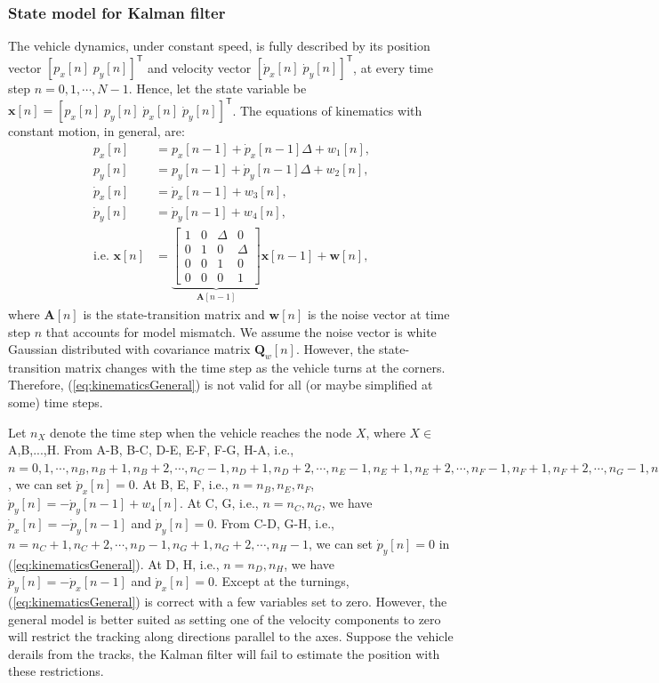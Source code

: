 \documentclass[11pt]{article}
\newcommand{\bx}{\mathbf{x}}
\newcommand{\bw}{\mathbf{w}}
\newcommand{\bA}{\mathbf{A}}
\newcommand{\bQ}{\mathbf{Q}}
\newcommand{\TT}{\mathsf{T}}
\begin{document}
\subsubsection{State model for Kalman filter}
\label{subsubsec:stateModel}

The vehicle dynamics, under constant speed, is fully described by its position vector $[p_{x}[n] \; p_{y}[n]]^{\TT}$ and velocity vector $[\dot{p}_{x}[n] \; \dot{p}_{y}[n]]^{\TT}$, at every time step $n=0,1,\cdots,N-1$. Hence, let the state variable be $\bx[n] = [p_{x}[n] \; p_{y}[n] \; \dot{p}_{x}[n] \; \dot{p}_{y}[n]]^{\TT}$. The equations of kinematics with constant motion, in general, are:
\begin{equation}
\begin{split}
	p_{x}[n] &= p_{x}[n-1] + \dot{p}_{x}[n-1] \Delta + w_{1}[n], \\
	p_{y}[n] &= p_{y}[n-1] + \dot{p}_{y}[n-1] \Delta + w_{2}[n], \\
	\dot{p}_{x}[n] &= \dot{p}_{x}[n-1] + w_{3}[n], \\
	\dot{p}_{y}[n] &= \dot{p}_{y}[n-1] + w_{4}[n], \\
	\text{i.e. }
	\bx[n] &= \underbrace{\begin{bmatrix}
		1 & 0 & \Delta & 0 \\
		0 & 1 & 0 & \Delta \\
		0 & 0 & 1 & 0 \\
		0 & 0 & 0 & 1
	\end{bmatrix}}_{\bA[n-1]} \bx[n-1] + \bw[n],
\end{split}
\label{eq:kinematicsGeneral}
\end{equation}
where $\bA[n]$ is the state-transition matrix and $\bw[n]$ is the noise vector at time step $n$ that accounts for model mismatch. We assume the noise vector is white Gaussian distributed with covariance matrix $\bQ_{w}[n]$. However, the state-transition matrix changes with the time step as the vehicle turns at the corners. Therefore, (\ref{eq:kinematicsGeneral}) is not valid for all (or maybe simplified at some) time steps.

Let $n_{X}$ denote the time step when the vehicle reaches the node $X$, where $X\in$ A,B,...,H. From A-B, B-C, D-E, E-F, F-G, H-A, i.e., $n=0,1,\cdots,n_{B}, n_{B}+1,n_{B}+2,\cdots,n_{C}-1, n_{D}+1,n_{D}+2,\cdots,n_{E}-1, n_{E}+1,n_{E}+2,\cdots,n_{F}-1, n_{F}+1,n_{F}+2,\cdots,n_{G}-1, n_{H}+1,n_{H}+2,\cdots,N-1$, we can set $\dot{p}_{x}[n] = 0$. At B, E, F, i.e., $n=n_{B}, n_{E}, n_{F}$, $\dot{p}_{y}[n] = -\dot{p}_{y}[n-1] + w_{4}[n]$. At C, G, i.e., $n=n_{C},n_{G}$, we have $\dot{p}_{x}[n] = -\dot{p}_{y}[n-1]$ and $\dot{p}_{y}[n] = 0$. From C-D, G-H, i.e., $n=n_{C}+1,n_{C}+2,\cdots,n_{D}-1, n_{G}+1,n_{G}+2,\cdots,n_{H}-1$, we can set $\dot{p}_{y}[n] = 0$ in (\ref{eq:kinematicsGeneral}). At D, H, i.e., $n=n_{D}, n_{H}$, we have $\dot{p}_{y}[n] = -\dot{p}_{x}[n-1]$ and $\dot{p}_{x}[n]=0$. Except at the turnings, (\ref{eq:kinematicsGeneral}) is correct with a few variables set to zero. However, the general model is better suited as setting one of the velocity components to zero will restrict the tracking along directions parallel to the axes. Suppose the vehicle derails from the tracks, the Kalman filter will fail to estimate the position with these restrictions.
\end{document}
